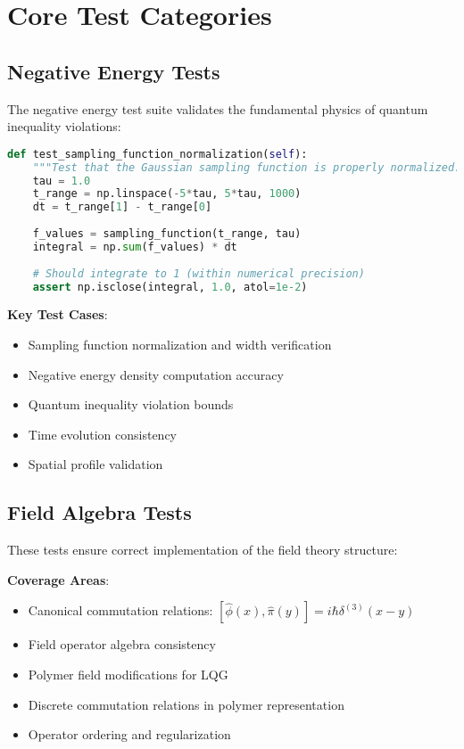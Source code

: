 \documentclass[12pt]{article}
\begin{document}
\section{Core Test Categories}

\subsection{Negative Energy Tests}

The negative energy test suite validates the fundamental physics of quantum inequality violations:

\begin{lstlisting}[language=Python, caption=Sample Negative Energy Test]
def test_sampling_function_normalization(self):
    """Test that the Gaussian sampling function is properly normalized."""
    tau = 1.0
    t_range = np.linspace(-5*tau, 5*tau, 1000)
    dt = t_range[1] - t_range[0]
    
    f_values = sampling_function(t_range, tau)
    integral = np.sum(f_values) * dt
    
    # Should integrate to 1 (within numerical precision)
    assert np.isclose(integral, 1.0, atol=1e-2)
\end{lstlisting}

\textbf{Key Test Cases}:
\begin{itemize}
\item Sampling function normalization and width verification
\item Negative energy density computation accuracy
\item Quantum inequality violation bounds
\item Time evolution consistency
\item Spatial profile validation
\end{itemize}

\subsection{Field Algebra Tests}

These tests ensure correct implementation of the field theory structure:

\textbf{Coverage Areas}:
\begin{itemize}
\item Canonical commutation relations: $[\hat{\phi}(x), \hat{\pi}(y)] = i\hbar\delta^{(3)}(x-y)$
\item Field operator algebra consistency
\item Polymer field modifications for LQG
\item Discrete commutation relations in polymer representation
\item Operator ordering and regularization
\end{itemize}
\end{document}
